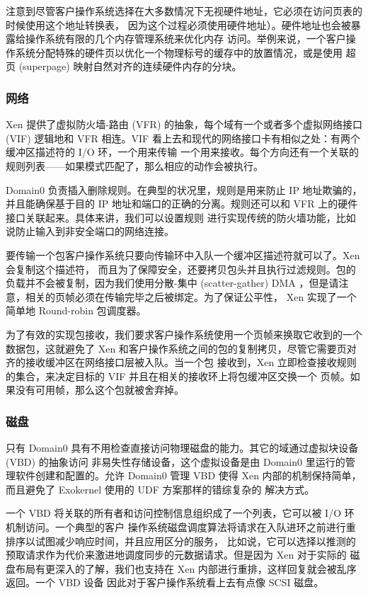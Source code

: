 注意到尽管客户操作系统选择在大多数情况下无视硬件地址，它必须在访问页表的时候使用这个地址转换表，
因为这个过程必须使用硬件地址）。硬件地址也会被暴露给操作系统有限的几个内存管理系统来优化内存
访问。举例来说，一个客户操作系统分配特殊的硬件页以优化一个物理标号的缓存中的放置情况，或是使用
超页 (superpage) 映射自然对齐的连续硬件内存的分块。

\subsubsection{网络}

Xen 提供了虚拟防火墙-路由 (VFR) 的抽象，每个域有一个或者多个虚拟网络接口 (VIF) 逻辑地和
VFR 相连。VIF 看上去和现代的网络接口卡有相似之处：有两个缓冲区描述符的 I/O 环，一个用来传输
一个用来接收。每个方向还有一个关联的规则列表——如果模式匹配了，那么相应的动作会被执行。

Domain0 负责插入删除规则。在典型的状况里，规则是用来防止 IP 地址欺骗的，并且能确保基于目的
IP 地址和端口的正确的分离。规则还可以和 VFR 上的硬件接口关联起来。具体来讲，我们可以设置规则
进行实现传统的防火墙功能，比如说防止输入到非安全端口的网络连接。

要传输一个包客户操作系统只要向传输环中入队一个缓冲区描述符就可以了。Xen 会复制这个描述符，
而且为了保障安全，还要拷贝包头并且执行过滤规则。包的负载并不会被复制，因为我们使用分散-集中
(scatter-gather) DMA ，但是请注意，相关的页帧必须在传输完毕之后被绑定。为了保证公平性，
Xen 实现了一个简单地 Round-robin 包调度器。

为了有效的实现包接收，我们要求客户操作系统使用一个页帧来换取它收到的一个数据包，这就避免了 Xen
和客户操作系统之间的包的复制拷贝，尽管它需要页对齐的接收缓冲区在网络接口层被入队。当一个包
接收到，Xen 立即检查接收规则的集合，来决定目标的 VIF 并且在相关的接收环上将包缓冲区交换一个
页帧。如果没有可用帧，那么这个包就被舍弃掉。

\subsubsection{磁盘}

只有 Domain0 具有不用检查直接访问物理磁盘的能力。其它的域通过虚拟块设备 (VBD) 的抽象访问
非易失性存储设备，这个虚拟设备是由 Domain0 里运行的管理软件创建和配置的。允许 Domain0 管理
VBD 使得 Xen 内部的机制保持简单，而且避免了 Exokernel 使用的 UDF 方案那样的错综复杂的
解决方式。

一个 VBD 将关联的所有者和访问控制信息组织成了一个列表，它可以被 I/O 环机制访问。一个典型的客户
操作系统磁盘调度算法将请求在入队进环之前进行重排序以试图减少响应时间，并且应用区分的服务，
比如说，它可以选择以推测的预取请求作为代价来激进地调度同步的元数据请求。但是因为 Xen 对于实际的
磁盘布局有更深入的了解，我们也支持在 Xen 内部进行重排，这样回复就会被乱序返回。一个 VBD 设备
因此对于客户操作系统看上去有点像 SCSI 磁盘。

